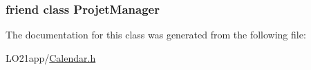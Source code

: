 \subsubsection[{Projet\+Manager}]{\setlength{\rightskip}{0pt plus 5cm}friend class {\bf Projet\+Manager}\hspace{0.3cm}{\ttfamily [friend]}}\label{class_projet_manager_1_1_iterator_aaaed9857b3481233fa7c581b5c86151d}


The documentation for this class was generated from the following file\+:\begin{DoxyCompactItemize}
\item 
L\+O21app/\hyperlink{_calendar_8h}{Calendar.\+h}\end{DoxyCompactItemize}
